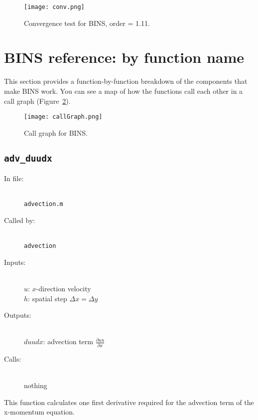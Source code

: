 \documentclass[12pt]{article}
\begin{document}
\begin{figure}
\center
\texttt{[image: conv.png]} 
\caption{Convergence test for BINS, order = 1.11.}
\label{conv}
\end{figure}


\FloatBarrier
\section{BINS reference: by function name}
This section provides a function-by-function breakdown of the components that make BINS work.  You can see a map of how the functions call each other in a call graph (Figure~\ref{callGraph}).

\begin{figure}
\center
\texttt{[image: callGraph.png]} 
\caption{Call graph for BINS.}
\label{callGraph}
\end{figure}

\subsection{\texttt{adv\_duudx}}
\begin{description}
\item[In file:] \hfill \\ \texttt{advection.m}
\item[Called by:] \hfill \\ \texttt{advection}
\item[Inputs:] \hfill \\ $u$: $x$-direction velocity \\ $h$: spatial step $\Delta x = \Delta y$
\item[Outputs:] \hfill \\ $duudx$: advection term $\frac{\partial uu}{\partial x}$
\item[Calls:] \hfill \\ nothing
\end{description}
This function calculates one first derivative required for the advection term of the x-momentum equation.
\end{document}

